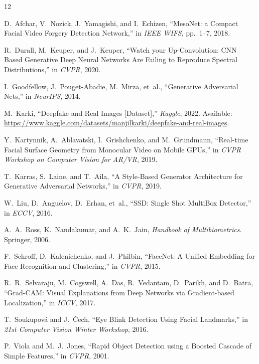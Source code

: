 \documentclass[conference,10pt]{IEEEtran}
\begin{document}
\begin{thebibliography}{12}

D.~Afchar, V.~Nozick, J.~Yamagishi, and I.~Echizen, ``MesoNet: a Compact Facial Video Forgery Detection Network,'' in \textit{IEEE WIFS}, pp.~1--7, 2018.

R.~Durall, M.~Keuper, and J.~Keuper, ``Watch your Up-Convolution: CNN Based Generative Deep Neural Networks Are Failing to Reproduce Spectral Distributions,'' in \textit{CVPR}, 2020.

I.~Goodfellow, J.~Pouget-Abadie, M.~Mirza, et~al., ``Generative Adversarial Nets,'' in \textit{NeurIPS}, 2014.

M.~Karki, ``Deepfake and Real Images [Dataset],'' \textit{Kaggle}, 2022. Available: \url{https://www.kaggle.com/datasets/manjilkarki/deepfake-and-real-images}.

Y.~Kartynnik, A.~Ablavatski, I.~Grishchenko, and M.~Grundmann, ``Real-time Facial Surface Geometry from Monocular Video on Mobile GPUs,'' in \textit{CVPR Workshop on Computer Vision for AR/VR}, 2019.

T.~Karras, S.~Laine, and T.~Aila, ``A Style-Based Generator Architecture for Generative Adversarial Networks,'' in \textit{CVPR}, 2019.

W.~Liu, D.~Anguelov, D.~Erhan, et~al., ``SSD: Single Shot MultiBox Detector,'' in \textit{ECCV}, 2016.

A.~A.~Ross, K.~Nandakumar, and A.~K.~Jain, \textit{Handbook of Multibiometrics}. Springer, 2006.

F.~Schroff, D.~Kalenichenko, and J.~Philbin, ``FaceNet: A Unified Embedding for Face Recognition and Clustering,'' in \textit{CVPR}, 2015.

R.~R.~Selvaraju, M.~Cogswell, A.~Das, R.~Vedantam, D.~Parikh, and D.~Batra, ``Grad-CAM: Visual Explanations from Deep Networks via Gradient-based Localization,'' in \textit{ICCV}, 2017.

T.~Soukupov\'{a} and J.~\v{C}ech, ``Eye Blink Detection Using Facial Landmarks,'' in \textit{21st Computer Vision Winter Workshop}, 2016.

P.~Viola and M.~J.~Jones, ``Rapid Object Detection using a Boosted Cascade of Simple Features,'' in \textit{CVPR}, 2001.

\end{thebibliography}
\end{document}
